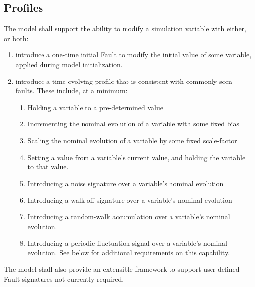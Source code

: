 \documentclass[11pt,fleqn]{report}
\begin{document}
\subsection {Profiles}
The model shall support the ability to modify a simulation variable with
either, or both:
\begin{enumerate}
 \item introduce a one-time initial Fault to modify the initial value of
       some variable, applied during model initialization.
 \item introduce a time-evolving profile that is consistent with commonly
       seen faults. These include, at a minimum:
 \begin{enumerate}
  \item Holding a variable to a pre-determined value
  \item Incrementing the nominal evolution of a variable with some fixed bias
  \item Scaling the nominal evolution of a variable by some fixed scale-factor
  \item Setting a value from a variable's current value, and holding the
        variable to that value.
  \item Introducing a noise signature over a variable's nominal evolution
  \item Introducing a walk-off signature over a variable's nominal evolution
  \item Introducing a random-walk accumulation over a variable's nominal
        evolution.
  \item Introducing a periodic-fluctuation signal over a variable's nominal
        evolution. See below for additional requirements on this capability.
 \end{enumerate}
\end{enumerate}
The model shall also provide an extensible framework to support user-defined
Fault signatures not currently required.
\end{document}
